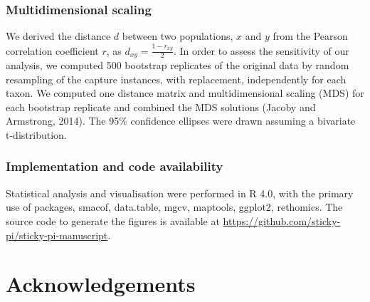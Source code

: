 \documentclass[12pt]{article}
\begin{document}
\begin{linenumbers}
		\subsubsection*{Multidimensional scaling}

		We derived the distance $d$ between two populations, $x$ and $y$ from the Pearson correlation coefficient $r$, as $d_{xy} = \frac{1 - r_{xy}}{2}$. In order to assess the sensitivity of our analysis, we computed 500 bootstrap replicates of the original data by random resampling of the capture instances, with replacement, independently for each taxon. We computed one distance matrix and multidimensional scaling (MDS) for each bootstrap replicate and combined the MDS solutions (Jacoby and Armstrong, 2014). The 95\% confidence ellipses were drawn assuming a bivariate t-distribution.

		\subsubsection*{Implementation and code availability}

		Statistical analysis and visualisation were performed in R 4.0\cite{r_core_team_r_2021}, with the primary use of packages, smacof\cite{leeuw_multidimensional_2009}, data.table\cite{dowle_datatable_2020}, mgcv\cite{wood_generalized_2017}, maptools\cite{bivand_maptools_2020}, ggplot2\cite{wickham_ggplot2_2016}, 
		rethomics\cite{geissmann_rethomics_2019}. 
		The source code to generate the figures is available at \href{https://github.com/sticky-pi/sticky-pi-manuscript}{https://github.com/sticky-pi/sticky-pi-manuscript}.

		
		\section*{Acknowledgements}
		{

}
\end{linenumbers}
\end{document}

